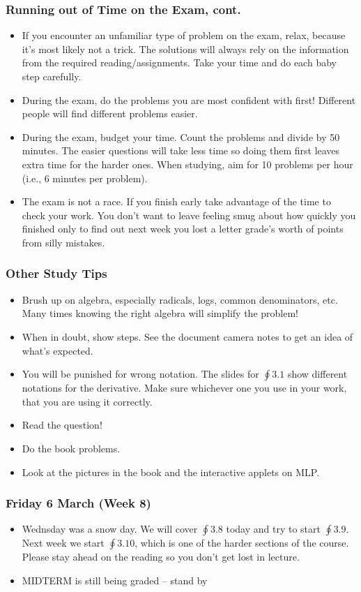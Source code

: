 \documentclass[14pt]{beamer}
\begin{document}
\begin{frame}
\frametitle{Running out of Time on the Exam, cont.}
\footnotesize
\begin{itemize}
\item If you encounter an unfamiliar type of problem on the exam, relax, because it's most likely not a trick.  The solutions will always rely on the information from the required reading/assignments.  Take your time and do each baby step carefully.  
\item During the exam, do the problems you are most confident with first!  Different people will find different problems easier.
\item During the exam, budget your time.  Count the problems and divide by 50 minutes.  The easier questions will take less time so doing them first leaves extra time for the harder ones.  When studying, aim for 10 problems per hour (i.e., 6 minutes per problem).
\item The exam is not a race.  If you finish early take advantage of the time to check your work.  You don't want to leave feeling smug about how quickly you finished only to find out next week you lost a letter grade's worth of points from silly mistakes.
\end{itemize}
\end{frame}

\begin{frame}
\frametitle{Other Study Tips}
\footnotesize
\begin{itemize}
\item Brush up on algebra, especially radicals, logs, common denominators, etc.  Many times knowing the right algebra will simplify the problem!
\item When in doubt, show steps.  See the document camera notes to get an idea of what's expected.
\item You will be punished for wrong notation.  The slides for $\oint 3.1$ show different notations for the derivative.  Make sure whichever one you use in your work, that you are using it correctly.
\item Read the question!  
\item Do the book problems.
\item Look at the pictures in the book and the interactive applets on MLP.
\end{itemize}
\end{frame}


\begin{frame}
\frametitle{Friday 6 March (Week 8)}
\small
\begin{itemize}
\item Wednsday was a snow day.  We will cover $\oint 3.8$ today and try to start $\oint 3.9$.  Next week we start $\oint 3.10$, which is one of the harder sections of the course.  Please stay ahead on the reading so you don't get lost in lecture.
\item MIDTERM is still being graded -- stand by
\end{itemize}
\end{frame}
\end{document}
